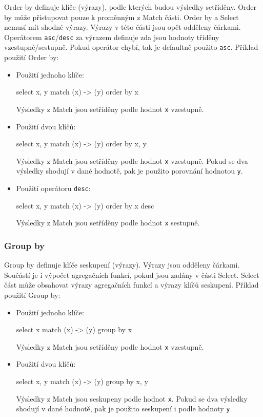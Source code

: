 Order by definuje klíče (výrazy), podle kterých budou výsledky setříděny.
Order by může přistupovat pouze k proměnným z Match části.
Order by a Select nemusí mít shodné výrazy.
Výrazy v této části jsou opět odděleny čárkami.
Operátorem \texttt{asc}/\texttt{desc} za výrazem definuje zda jsou hodnoty tříděny vzestupně/sestupně.
Pokud operátor chybí, tak je defaultně použito \texttt{asc}.
Příklad použití Order by:
\begin{itemize}
\item
Použití jednoho klíče:
\begin{code}
select x, y match (x) -> (y) order by x
\end{code}
Výsledky z Match jsou setříděny podle hodnot \texttt{x} vzestupně.

\item
Použití dvou klíčů:
\begin{code}
select x, y match (x) -> (y) order by x, y
\end{code}
Výsledky z Match jsou setříděny podle hodnot \texttt{x} vzestupně.
Pokud se dva výsledky shodují v dané hodnotě, pak je použito porovnání hodnotou \texttt{y}.

\item
Použití operátoru \texttt{desc}:
\begin{code}
select x, y match (x) -> (y) order by x desc
\end{code}
Výsledky z Match jsou setříděny podle hodnot \texttt{x} sestupně.
\end{itemize}

\subsubsection{Group by}

Group by definuje klíče seskupení (výrazy).
Výrazy jsou odděleny čárkami.
Součástí je i výpočet agregačních funkcí, pokud jsou zadány v části Select.
Select část může obsahovat výrazy agregačních funkcí a výrazy klíčů seskupení.
Příklad použití Group by:
\begin{itemize}
\item
Použití jednoho klíče:
\begin{code}
select x match (x) -> (y) group by x
\end{code}
Výsledky z Match jsou setříděny podle hodnot \texttt{x} vzestupně.

\item
Použití dvou klíčů:
\begin{code}
select x, y match (x) -> (y) group by x, y
\end{code}
Výsledky z Match jsou seskupeny podle hodnot \texttt{x}.
Pokud se dva výsledky shodují v dané hodnotě, pak je použito seskupení i podle hodnoty \texttt{y}.
\end{itemize}